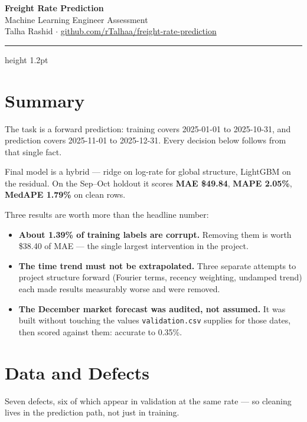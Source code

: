 \documentclass[11pt,a4paper]{article}
\newcommand{\key}[1]{\textbf{\color{spotter}#1}}
\begin{document}
\begin{center}
{\LARGE\bfseries\color{spotter} Freight Rate Prediction}\\[4pt]
{\large Machine Learning Engineer Assessment}\\[8pt]
{\small Talha Rashid \quad$\cdot$\quad
\href{https://github.com/rTalhaa/freight-rate-prediction}{github.com/rTalhaa/freight-rate-prediction}}
\end{center}

\vspace{2pt}
\hrule height 1.2pt
\vspace{10pt}

\section{Summary}

The task is a forward prediction: training covers 2025-01-01 to 2025-10-31, and
prediction covers 2025-11-01 to 2025-12-31. Every decision below follows from
that single fact.

Final model is a hybrid --- ridge on log-rate for global structure, LightGBM on
the residual. On the Sep--Oct holdout it scores \key{MAE \$49.84}, \key{MAPE
2.05\%}, \key{MedAPE 1.79\%} on clean rows.

Three results are worth more than the headline number:

\begin{itemize}\itemsep2pt
\item \key{About 1.39\% of training labels are corrupt.} Removing them is worth
\$38.40 of MAE --- the single largest intervention in the project.
\item \key{The time trend must not be extrapolated.} Three separate attempts to
project structure forward (Fourier terms, recency weighting, undamped trend) each
made results measurably worse and were removed.
\item \key{The December market forecast was audited, not assumed.} It was built
without touching the values \texttt{validation.csv} supplies for those dates, then
scored against them: accurate to 0.35\%.
\end{itemize}

\section{Data and Defects}

Seven defects, six of which appear in validation at the same rate --- so cleaning
lives in the prediction path, not just in training.
\end{document}
